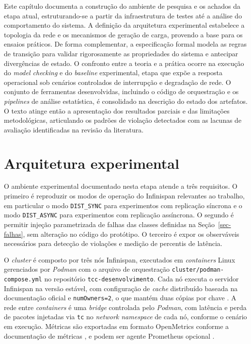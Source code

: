 
Este capítulo documenta a construção do ambiente de pesquisa e os achados da etapa atual, estruturando-se a partir da infraestrutura de testes até a análise do comportamento do sistema. A definição da arquitetura experimental estabelece a topologia da rede e os mecanismos de geração de carga, provendo a base para os ensaios práticos. De forma complementar, a especificação formal modela as regras de transição para validar rigorosamente as propriedades do sistema e antecipar divergências de estado. O confronto entre a teoria e a prática ocorre na execução do \emph{model checking} e do \emph{baseline} experimental, etapa que expõe a resposta operacional sob cenários controlados de interrupção e degradação de rede. O conjunto de ferramentas desenvolvidas, incluindo o código de orquestração e os \emph{pipelines} de análise estatística, é consolidado na descrição do estado dos artefatos. O texto atinge então a apresentação dos resultados parciais e das limitações metodológicas, articulando os padrões de violação detectados com as lacunas de avaliação identificadas na revisão da literatura.

\section{Arquitetura experimental}
\label{sec-arquitetura}

O ambiente experimental documentado nesta etapa atende a três requisitos. O primeiro é reproduzir os modos de operação do Infinispan relevantes ao trabalho, em particular o modo \texttt{DIST\_SYNC} para experimentos com replicação síncrona e o modo \texttt{DIST\_ASYNC} para experimentos com replicação assíncrona. O segundo é permitir injeção parametrizada de falhas das classes definidas na Seção~\ref{sec-falhas}, sem alteração no código do protótipo. O terceiro é expor os observáveis necessários para detecção de violações e medição de percentis de latência.

O \emph{cluster} é composto por três nós Infinispan, executados em \emph{containers} Linux gerenciados por \emph{Podman} \citep{podman_docs} com o arquivo de orquestração \texttt{cluster/podman-compose.yml} no repositório \texttt{tcc-desenvolvimento}. Cada nó executa o servidor Infinispan na versão estável, com configuração de \emph{cache} distribuído baseada na documentação oficial e \texttt{numOwners=2}, o que mantém duas cópias por chave \citep{infinispan_docs_stable}. A rede entre \emph{containers} é uma \emph{bridge} controlada pelo \emph{Podman}, com latência e perda de pacotes injetadas via \texttt{tc} no \emph{network namespace} de cada nó, conforme o cenário em execução. Métricas são exportadas em formato OpenMetrics \citep{openmetrics_spec} conforme a documentação de métricas \citep{infinispan_metrics}, e podem ser agente Prometheus opcional \citep{prometheus_docs}.

